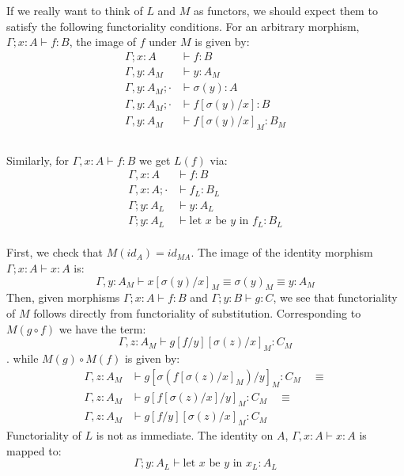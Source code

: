 If we really want to think of $L$ and $M$ as functors, we should expect them to satisfy the following functoriality conditions. For an arbitrary morphism, $\Gamma; x : A \vdash f : B$, the image of $f$ under $M$ is given by:\\
\[
  \begin{split}
  \Gamma; x : A &\vdash f : B\\
  \Gamma, y : A_M &\vdash y : A_M\\
  \Gamma, y : A_M; \cdot &\vdash \sigma(y) : A\\
  \Gamma, y : A_M; \cdot &\vdash f[\sigma(y)/x] : B\\
  \Gamma, y : A_M &\vdash f[\sigma(y)/x]_M : B_M\\
  \end{split}
\]\\
Similarly, for $\Gamma, x : A \vdash f : B$ we get $L(f)$ via:
\[
  \begin{split}
    \Gamma, x : A &\vdash f : B\\
    \Gamma, x : A; \cdot &\vdash f_L : B_L\\
    \Gamma; y : A_L &\vdash y : A_L\\
    \Gamma; y : A_L &\vdash \text{let $x$ be $y$ in $f_L$} : B_L
  \end{split}
\]\\
First, we check that $M(id_A) = id_{MA}$.  The image of the identity morphism $\Gamma; x : A \vdash x : A$ is:
\[
  \Gamma, y : A_M \vdash x[\sigma(y)/x]_M \equiv \sigma(y)_M \equiv y : A_M
\]
Then, given morphisms $\Gamma; x : A \vdash f : B$ and $\Gamma; y : B \vdash g : C$, we see that functoriality of $M$ follows directly from functoriality of substitution. Corresponding to $M(g \circ f)$ we have the term:
\[
\Gamma, z : A_M \vdash g[f/y][\sigma(z)/x]_M : C_M
\].
while $M(g) \circ M(f)$ is given by:
\[
  \begin{split}
    \Gamma, z : A_M &\vdash g[\sigma(f[\sigma(z)/x]_M)/y]_M : C_M \quad \equiv\\
    \Gamma, z : A_M &\vdash g[f[\sigma(z)/x]/y]_M : C_M \quad \equiv\\
    \Gamma, z : A_M &\vdash g[f/y][\sigma(z)/x]_M : C_M
  \end{split}
\]
Functoriality of $L$ is not as immediate. The identity on $A$, $\Gamma, x : A \vdash x : A$ is mapped to:
\[
  \Gamma; y : A_L \vdash \text{let $x$ be $y$ in $x_L$} : A_L
\]



